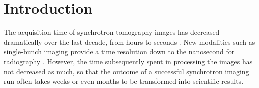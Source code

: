\documentclass[twocolumn]{bmcart}%
\begin{document}
\begin{frontmatter}
\begin{abstractbox}

\begin{keyword}
\end{keyword}


\end{abstractbox}
%

\end{frontmatter}



\section*{Introduction}

The acquisition time of synchrotron tomography images has decreased
dramatically over the last decade, from hours to
seconds \citep{Maire2014}. New modalities such as single-bunch
imaging provide a time resolution down to the nanosecond
for radiography \citep{Rack2014}. However, the time subsequently spent in processing the
images has not decreased as much, so that the outcome of a successful
synchrotron imaging run often takes weeks or even months to be
transformed into scientific results. 
\end{document}
